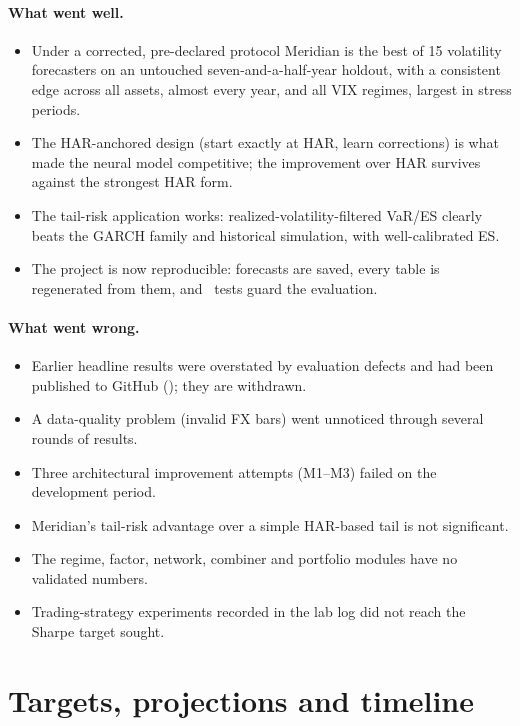 \documentclass[11pt,a4paper]{article}
\begin{document}
\paragraph{What went well.}
\begin{itemize}
\item Under a corrected, pre-declared protocol Meridian is the best of 15 volatility forecasters on an
untouched seven-and-a-half-year holdout, with a consistent edge across all assets, almost every year,
and all VIX regimes, largest in stress periods.
\item The HAR-anchored design (start exactly at HAR, learn corrections) is what made the neural model
competitive; the improvement over HAR survives against the strongest HAR form.
\item The tail-risk application works: realized-volatility-filtered VaR/ES clearly beats the GARCH
family and historical simulation, with well-calibrated ES.
\item The project is now reproducible: forecasts are saved, every table is regenerated from them, and
\NTests\ tests guard the evaluation.
\end{itemize}

\paragraph{What went wrong.}
\begin{itemize}
\item Earlier headline results were overstated by evaluation defects and had been published to GitHub
(\texttt{\GitMain}); they are withdrawn.
\item A data-quality problem (invalid FX bars) went unnoticed through several rounds of results.
\item Three architectural improvement attempts (M1--M3) failed on the development period.
\item Meridian's tail-risk advantage over a simple HAR-based tail is not significant.
\item The regime, factor, network, combiner and portfolio modules have no validated numbers.
\item Trading-strategy experiments recorded in the lab log did not reach the Sharpe target sought.
\end{itemize}

\section{Targets, projections and timeline}\label{sec:targets}
\end{document}
